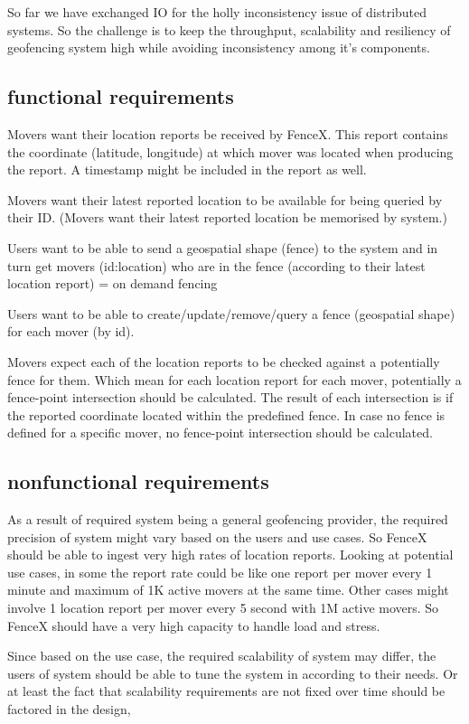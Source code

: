 \documentclass[a4]{report}
\begin{document}
    So far we have exchanged IO for the holly inconsistency issue of distributed systems. So the challenge is to keep the throughput, scalability and resiliency of geofencing system high while avoiding inconsistency among it's components.

    \subsection{functional requirements}
    Movers want their location reports be received by FenceX. This report contains the coordinate (latitude, longitude) at which mover was located when producing the report. A timestamp might be included in the report as well.

    Movers want their latest reported location to be available for being queried by their ID. (Movers want their latest reported location be memorised by system.)

    Users want to be able to send a geospatial shape (fence) to the system and in turn get movers (id:location) who are in the fence (according to their latest location report) = on demand fencing

    Users want to be able to create/update/remove/query a fence (geospatial shape) for each mover (by id).

    Movers expect each of the location reports to be checked against a potentially fence for them. Which mean for each location report for each mover, potentially a fence-point intersection should be
    calculated. The result of each intersection is if the reported coordinate located within the predefined fence. In case no fence is defined for a specific mover, no fence-point intersection should be calculated.

    \subsection{nonfunctional requirements}
    As a result of required system being a general geofencing provider, the required precision of system might vary based on the users and use cases. So FenceX should be able to ingest very high rates of location reports. Looking at potential use cases, in some the report rate could be like one report per mover every 1 minute and maximum of 1K active movers at the same time.
    Other cases might involve 1 location report per mover every 5 second with 1M active movers. So FenceX should have a very high capacity to handle load and stress.

    Since based on the use case, the required scalability of system may differ, the users of system should be able to tune the system in according to their needs. Or at least the fact that scalability requirements are not fixed over time should be factored in the design,
\end{document}
